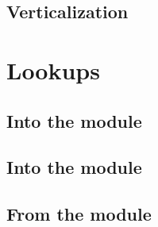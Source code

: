 \subsection{Verticalization}                         \label{log info: constraints: verticalization}        

\section{Lookups}                                    \label{log info: lookups}
\subsection{Into the \rlpTxnRcptMod{} module}        \label{log info: lookups: txn rlp}                    
\subsection{Into the \logDataMod{} module}           \label{log info: lookups: log data}                   
\subsection{From the \hubMod{} module}               \label{log info: lookups: batch data}                 
